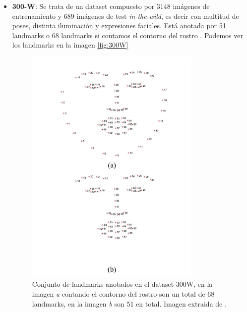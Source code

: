     \begin{itemize}
    \item \textbf{300-W}: Se trata de un dataset compuesto por $3148$ imágenes de entrenamiento y $689$ imágenes de test \textit{in-the-wild}, es decir con multitud de poses, distinta iluminación y expresiones faciales. Está anotada por 51 landmarks o 68 landmarks si contamos el contorno del rostro \cite{300W}. Podemos ver los landmarks en la imagen \autoref{fig:300W}
    
    \begin{figure}[!h]
        \centering
        \includegraphics[width=0.8\textwidth]{img/33W.png}
        \caption{Conjunto de landmarks anotados en el dataset 300W, en la imagen \textit{a} contando el contorno del rostro son un total de 68 landmarks, en la imagen \textit{b} son 51 en total. Imagen extraida de \cite{300W}.}
        \label{fig:300W}
    \end{figure}
    

\end{itemize}
